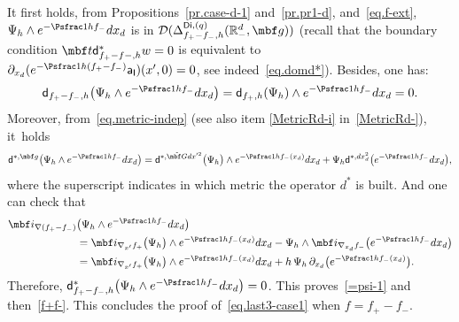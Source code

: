 It first holds, from Propositions~\ref{pr.case-d-1}
and~\ref{pr.pr1-d}, and~\eqref{eq.f-ext}, $\Psi_h \wedge e^{-\Psfrac 1h f_- }dx_d$ is in $\mathcal D(\Delta_{f_+ -f_-,h}^{\mathsf{Di},(q)}(\mathbb R_-^d, \mbf g))$ (recall that the boundary condition $\mbf t \mathsf d_{f_+-f-,h}^*w =0$ is equivalent to $\partial_{x_d}(e^{-\Psfrac 1h (f_+-f_-)}\mathsf a_{\mathsf I})(x',0)=0$, see indeed~\eqref{eq.domd*}).
Besides, one has:
\[
\mathsf d_{f_+-f_-,h}\bigl(\Psi_h\wedge e^{-\Psfrac 1h f_-}dx_d\bigr)= \mathsf d_{f_+,h}(\Psi_h) \wedge e^{-\Psfrac 1h f_-}dx_d=0.
\]
Moreover, from~\eqref{eq.metric-indep} (see also item \eqref{MetricRd-i}
in~\ref{MetricRd-}), it~holds
\[
\mathsf d^{*, { \mbf g}}\bigl(\Psi_h\wedge e^{-\Psfrac 1h f_-}dx_d\bigr)= \mathsf
d^{*,\tilde{ \mbf G}dx'^2}\bigl(\Psi_h\bigr) \wedge
e^{-\Psfrac 1h f_-(x_d)}dx_d+ \Psi_h \mathsf
d^{*, dx_d^2}\bigl(e^{-\Psfrac 1h f_-}dx_d\bigr),
\]
where the superscript indicates in which metric the operator $d^*$ is built.
And one can check that
\begin{align*}
\mbf i_{\nabla (f_+-f_-)}&\bigl(\Psi_h\wedge e^{-\Psfrac 1hf_-}dx_d\bigr)\\
&= \mbf i_{\nabla_{x'} f_+} \bigl(\Psi_h\bigr)\wedge e^{-\Psfrac 1h f_-(x_d)}dx_d-\Psi_h\wedge \mbf i_{\nabla_{x_d} f_-}\bigl(e^{-\Psfrac 1h f_-}dx_d\bigr)\\
&=\mbf i_{\nabla_{x'} f_+} \bigl(\Psi_h\bigr)\wedge e^{-\Psfrac 1h f_-(x_d)}dx_d+h\, \Psi_h \, \partial_{x_d}\bigl(e^{-\Psfrac 1h f_-(x_d)}\bigr).
\end{align*}
Therefore, $ \mathsf d^*_{f_+-f_-,h}\bigl(\Psi_h\wedge e^{-\Psfrac 1h f_-}dx_d\bigr)=0$.
This proves~\eqref{=psi-1} and then~\eqref{f+f-}. This concludes the proof of~\eqref{eq.last3-case1} when $f=f_+-f_-$.

